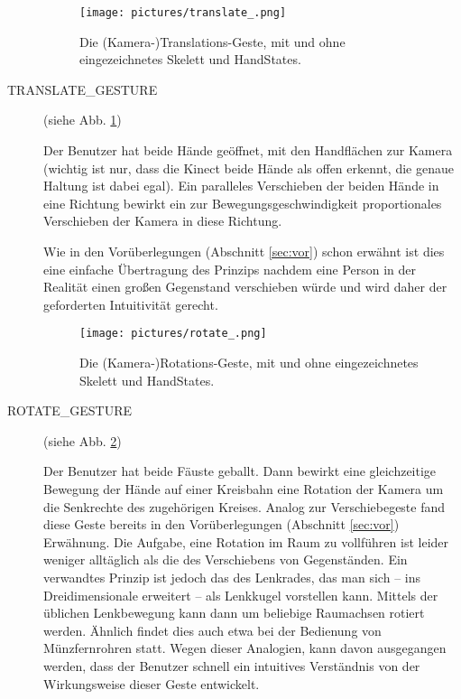 	\begin{description}
		\begin{figure}[H]
		\centering
		\texttt{[image: pictures/translate\_.png]}
		\caption{Die (Kamera-)Translations-Geste, mit und ohne eingezeichnetes Skelett und HandStates.}\label{fig:translateg}
		\end{figure}
		\item[TRANSLATE\_GESTURE] (siehe Abb. \ref{fig:translateg})\par
		Der Benutzer hat beide Hände geöffnet, mit den Handflächen zur Kamera (wichtig ist nur, dass die Kinect beide Hände als offen erkennt, die genaue Haltung ist dabei egal). Ein paralleles Verschieben der beiden Hände in eine Richtung bewirkt ein zur Bewegungsgeschwindigkeit proportionales Verschieben der Kamera in diese Richtung.\par 
		Wie in den Vorüberlegungen (Abschnitt \ref{sec:vor}) schon erwähnt ist dies eine einfache Übertragung des Prinzips nachdem eine Person in der Realität einen großen Gegenstand verschieben würde und wird daher der geforderten Intuitivität gerecht.
		\par
		\begin{figure}[H]
		\centering
		\texttt{[image: pictures/rotate\_.png]}
		\caption{Die (Kamera-)Rotations-Geste, mit und ohne eingezeichnetes Skelett und HandStates.}\label{fig:rotateg}
		\end{figure}		
		\item[ROTATE\_GESTURE] (siehe Abb. \ref{fig:rotateg})\par
		Der Benutzer hat beide Fäuste geballt. Dann bewirkt eine gleichzeitige Bewegung der Hände auf einer Kreisbahn eine Rotation der Kamera um die Senkrechte des zugehörigen Kreises.
		Analog zur Verschiebegeste fand diese Geste bereits in den Vorüberlegungen (Abschnitt \ref{sec:vor}) Erwähnung. Die Aufgabe, eine Rotation im Raum zu vollführen ist leider weniger alltäglich als die des Verschiebens von Gegenständen. Ein verwandtes Prinzip ist jedoch das des Lenkrades, das man sich --  ins Dreidimensionale erweitert -- als Lenkkugel vorstellen kann. Mittels der üblichen Lenkbewegung kann dann um beliebige Raumachsen rotiert werden. Ähnlich findet dies auch etwa bei der Bedienung von Münzfernrohren statt. Wegen dieser Analogien, kann davon ausgegangen werden, dass der Benutzer schnell ein intuitives Verständnis von der Wirkungsweise dieser Geste entwickelt.
		\par
		\begin{figure}[H]

\end{figure}
\end{description}
